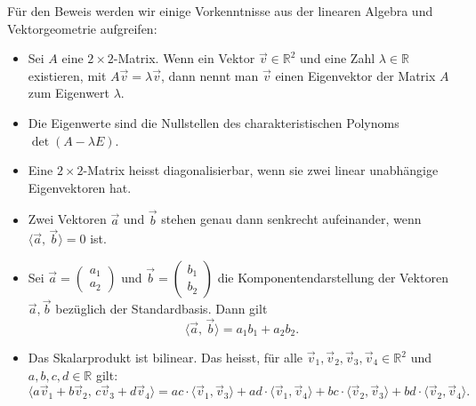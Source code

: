 Für den Beweis werden wir einige Vorkenntnisse aus der linearen Algebra und Vektorgeometrie aufgreifen:
\begin{itemize}
	\item Sei \(A\) eine \(2 \times 2\)-Matrix. Wenn ein Vektor \(\vec{v} \in \mathbb{R}^2\) und eine Zahl \(\lambda \in \mathbb{R}\) existieren, mit \(A\vec{v} = \lambda \vec{v}\), dann nennt man \(\vec{v}\) einen Eigenvektor der Matrix \(A\) zum Eigenwert \(\lambda\).
	\item Die Eigenwerte sind die Nullstellen des charakteristischen Polynoms \(\det(A - \lambda E)\).
	\item Eine \(2 \times 2\)-Matrix heisst diagonalisierbar, wenn sie zwei linear unabhängige Eigenvektoren hat.
	\item Zwei Vektoren \(\vec{a}\) und \(\vec{b}\) stehen genau dann senkrecht aufeinander, wenn \(\langle \vec{a} , \, \vec{b} \rangle = 0\) ist.
	\item Sei \(\vec{a} = \begin{pmatrix} a_1 \\ a_2 \end{pmatrix}\) und \(\vec{b} = \begin{pmatrix} b_1 \\ b_2 \end{pmatrix}\) die Komponentendarstellung der Vektoren \(\vec{a}, \vec{b}\) bezüglich der Standardbasis. Dann gilt
	      \[
		      \langle \vec{a} , \, \vec{b} \rangle = a_1 b_1 + a_2 b_2.
	      \]
	\item Das Skalarprodukt ist bilinear. Das heisst, für alle \(\vec{v}_1, \vec{v}_2, \vec{v}_3, \vec{v}_4 \in \mathbb{R}^2\) und \(a, b, c, d \in \mathbb{R}\) gilt:
	      \[
		      \langle a\vec{v}_1 + b\vec{v}_2 , \,  c\vec{v}_3 + d\vec{v}_4 \rangle = ac \cdot\langle\vec{v}_1 , \vec{v}_3 \rangle + ad \cdot\langle \vec{v}_1 , \vec{v}_4\rangle + bc\cdot \langle \vec{v}_2 , \vec{v}_3\rangle + bd \cdot\langle \vec{v}_2 , \vec{v}_4\rangle.
	      \]
\end{itemize}




